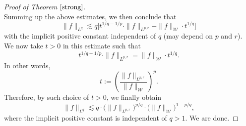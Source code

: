 \documentclass{birkjour}
\theoremstyle{definition}
\theoremstyle{remark}
\numberwithin{equation}{section}
\begin{document}
\begin{proof}[Proof of Theorem $\ref{strong}$]
\begin{equation*}
\end{equation*}
Summing up the above estimates, we then conclude that
\begin{equation*}
\|f\|_{L^q}\lesssim q\Big[t^{1/q-1/p}\cdot\|f\|_{L^{p,r}}+\|f\|_{\mathcal{W}}\cdot t^{1/q}\Big]
\end{equation*}
with the implicit positive constant independent of $q$ (may depend on $p$ and $r$). We now take $t>0$ in this estimate such that
\begin{equation*}
t^{1/q-1/p}\cdot\|f\|_{L^{p,r}}=\|f\|_{\mathcal{W}}\cdot t^{1/q}.
\end{equation*}
In other words,
\begin{equation*}
t:=\left(\frac{\|f\|_{L^{p,r}}}{\|f\|_{\mathcal{W}}}\right)^p.
\end{equation*}
Therefore, by such choice of $t>0$, we finally obtain
\begin{equation*}
\|f\|_{L^q}\lesssim q\cdot\big(\|f\|_{L^{p,r}}\big)^{p/q}\cdot\big(\|f\|_{\mathcal{W}}\big)^{1-p/q},
\end{equation*}
where the implicit positive constant is independent of $q>1$. We are done.
\end{proof}
\end{document}
